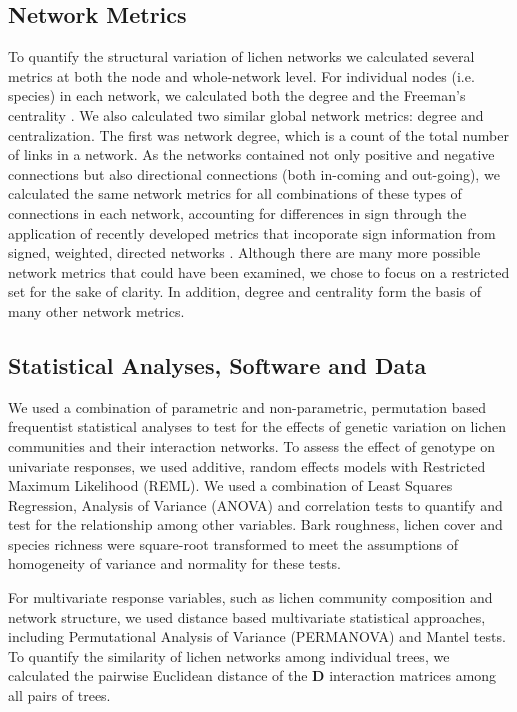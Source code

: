 \documentclass[fleqn,12pt]{olplainarticle}
\begin{document}
\subsection*{Network Metrics}

To quantify the structural variation of lichen networks we calculated
several metrics at both the node and whole-network level. For
individual nodes (i.e. species) in each network, we calculated both
the degree and the Freeman's centrality \cite{sna}. We also calculated
two similar global network metrics: degree and centralization. The
first was network degree, which is a count of the total number of
links in a network. As the networks contained not only positive and
negative connections but also directional connections (both in-coming
and out-going), we calculated the same network metrics for all
combinations of these types of connections in each network, accounting
for differences in sign through the application of recently developed
metrics that incoporate sign information from signed, weighted,
directed networks \cite{Everett2014NetworksTies}. Although there are
many more possible network metrics that could have been examined, we
chose to focus on a restricted set for the sake of clarity. In
addition, degree and centrality form the basis of many other network
metrics.


\subsection*{Statistical Analyses, Software and Data}

We used a combination of parametric and non-parametric, permutation
based frequentist statistical analyses to test for the effects of
genetic variation on lichen communities and their interaction
networks. To assess the effect of genotype on univariate responses, we
used additive, random effects models with Restricted Maximum
Likelihood (REML). We used a combination of Least Squares Regression,
Analysis of Variance (ANOVA) and correlation tests to quantify and
test for the relationship among other variables. Bark roughness,
lichen cover and species richness were square-root transformed to meet
the assumptions of homogeneity of variance and normality for these
tests.

For multivariate response variables, such as lichen community
composition and network structure, we used distance based multivariate
statistical approaches, including Permutational Analysis of Variance
(PERMANOVA) and Mantel tests. To quantify the similarity of lichen
networks among individual trees, we calculated the pairwise Euclidean
distance of the $\mathbf{D}$ interaction matrices among all pairs of
trees.
\end{document}
